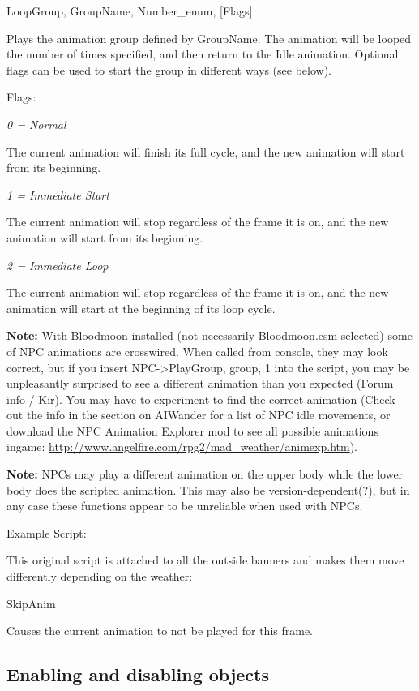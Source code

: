 \documentclass[
]{article}
\begin{document}
LoopGroup, GroupName, Number\_enum, {[}Flags{]}

Plays the animation group defined by GroupName. The animation will be
looped the number of times specified, and then return to the Idle
animation. Optional flags can be used to start the group in different
ways (see below).

Flags:

\emph{0 = Normal}

The current animation will finish its full cycle, and the new animation
will start from its beginning.

\emph{1 = Immediate Start}

The current animation will stop regardless of the frame it is on, and
the new animation will start from its beginning.

\emph{2 = Immediate Loop}

The current animation will stop regardless of the frame it is on, and
the new animation will start at the beginning of its loop cycle.

\textbf{Note:} With Bloodmoon installed (not necessarily Bloodmoon.esm
selected) some of NPC animations are crosswired. When called from
console, they may look correct, but if you insert
NPC-\textgreater PlayGroup, group, 1 into the script, you may be
unpleasantly surprised to see a different animation than you expected
(Forum info / Kir). You may have to experiment to find the correct
animation (Check out the info in the section on AIWander for a list of
NPC idle movements, or download the NPC Animation Explorer mod to see
all possible animations ingame:
\url{http://www.angelfire.com/rpg2/mad_weather/animexp.htm}).

\textbf{Note:} NPCs may play a different animation on the upper body
while the lower body does the scripted animation. This may also be
version-dependent(?), but in any case these functions appear to be
unreliable when used with NPCs.

Example Script:

This original script is attached to all the outside banners and makes
them move differently depending on the weather:



SkipAnim

Causes the current animation to not be played for this frame.

\hypertarget{enabling-and-disabling-objects}{%
\subsection{Enabling and disabling
objects}\label{enabling-and-disabling-objects}}
\end{document}

